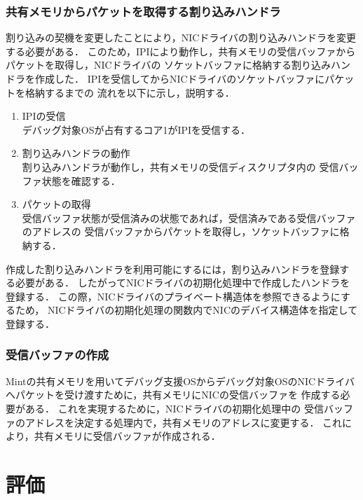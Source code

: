\documentclass[tanilab-enum]{graduate}
\begin{document}
\subsection{共有メモリからパケットを取得する割り込みハンドラ}\label{handler}
割り込みの契機を変更したことにより，NICドライバの割り込みハンドラを変更する必要がある．
このため，IPIにより動作し，共有メモリの受信バッファからパケットを取得し，NICドライバの
ソケットバッファに格納する割り込みハンドラを作成した．
IPIを受信してからNICドライバのソケットバッファにパケットを格納するまでの
流れを以下に示し，説明する．
\begin{enumerate}
    \item IPIの受信\\
        デバッグ対象OSが占有するコア1がIPIを受信する．
    \item 割り込みハンドラの動作\\
        割り込みハンドラが動作し，共有メモリの受信ディスクリプタ内の
        受信バッファ状態を確認する．
    \item パケットの取得\\
        受信バッファ状態が受信済みの状態であれば，受信済みである受信バッファのアドレスの
        受信バッファからパケットを取得し，ソケットバッファに格納する．
\end{enumerate}
作成した割り込みハンドラを利用可能にするには，割り込みハンドラを登録する必要がある．
したがってNICドライバの初期化処理中で作成したハンドラを登録する．
この際，NICドライバのプライベート構造体を参照できるようにするため，
NICドライバの初期化処理の関数内でNICのデバイス構造体を指定して登録する．
\subsection{受信バッファの作成}
Mintの共有メモリを用いてデバッグ支援OSからデバッグ対象OSのNICドライバ
へパケットを受け渡すために，共有メモリにNICの受信バッファを
作成する必要がある．
これを実現するために，NICドライバの初期化処理中の
受信バッファのアドレスを決定する処理内で，共有メモリのアドレスに変更する．
これにより，共有メモリに受信バッファが作成される．

\chapter{評価}\label{estimaion}
\end{document}
